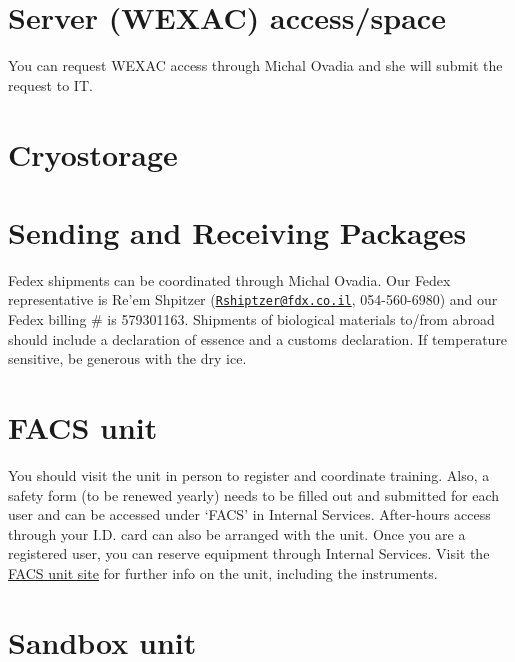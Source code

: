 \documentclass[]{book}
\begin{document}
\section{Server (WEXAC) access/space}\label{server-wexac-accessspace}

You can request WEXAC access through Michal Ovadia and she will submit
the request to IT.

\section{Cryostorage}\label{cryostorage}

\section{Sending and Receiving
Packages}\label{sending-and-receiving-packages}

Fedex shipments can be coordinated through Michal Ovadia. Our Fedex
representative is Re'em Shpitzer
(\href{mailto:Rshiptzer@fdx.co.il}{\nolinkurl{Rshiptzer@fdx.co.il}},
054-560-6980) and our Fedex billing \# is 579301163. Shipments of
biological materials to/from abroad should include a declaration of
essence and a customs declaration. If temperature sensitive, be generous
with the dry ice.

\section{FACS unit}\label{facs-unit}

You should visit the unit in person to register and coordinate training.
Also, a safety form (to be renewed yearly) needs to be filled out and
submitted for each user and can be accessed under `FACS' in Internal
Services. After-hours access through your I.D. card can also be arranged
with the unit. Once you are a registered user, you can reserve equipment
through Internal Services. Visit the
\href{https://www.weizmann.ac.il/LS_CoreFacilities/flow-cytometry/about}{FACS
unit site} for further info on the unit, including the instruments.

\section{Sandbox unit}\label{sandbox-unit}
\end{document}
